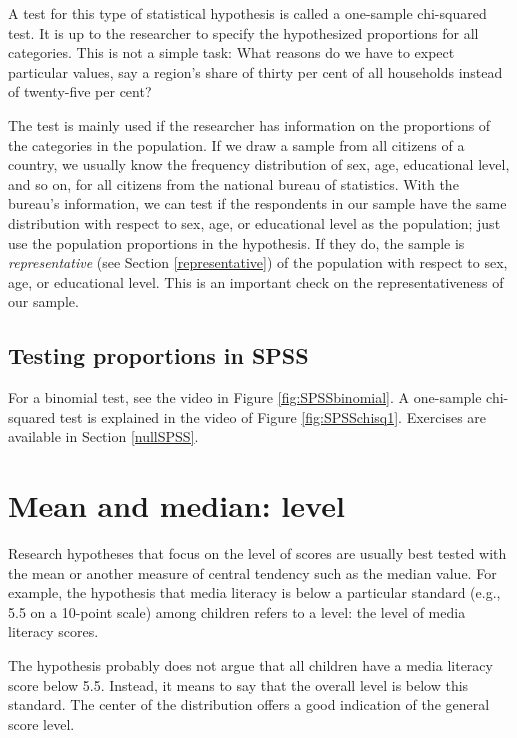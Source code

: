 \documentclass[a4paper]{book}
\theoremstyle{definition}
\theoremstyle{definition}
\theoremstyle{definition}
\theoremstyle{remark}
\begin{document}
A test for this type of statistical hypothesis is called a one-sample
chi-squared test. It is up to the researcher to specify the hypothesized
proportions for all categories. This is not a simple task: What reasons
do we have to expect particular values, say a region's share of thirty
per cent of all households instead of twenty-five per cent?

The test is mainly used if the researcher has information on the
proportions of the categories in the population. If we draw a sample
from all citizens of a country, we usually know the frequency
distribution of sex, age, educational level, and so on, for all citizens
from the national bureau of statistics. With the bureau's information,
we can test if the respondents in our sample have the same distribution
with respect to sex, age, or educational level as the population; just
use the population proportions in the hypothesis. If they do, the sample
is \emph{representative} (see Section \ref{representative}) of the
population with respect to sex, age, or educational level. This is an
important check on the representativeness of our sample.

\subsection*{Testing proportions in
SPSS}\label{testing-proportions-in-spss}

For a binomial test, see the video in Figure \ref{fig:SPSSbinomial}. A
one-sample chi-squared test is explained in the video of Figure
\ref{fig:SPSSchisq1}. Exercises are available in Section \ref{nullSPSS}.

\section*{Mean and median: level}\label{mean-and-median-level}

Research hypotheses that focus on the level of scores are usually best
tested with the mean or another measure of central tendency such as the
median value. For example, the hypothesis that media literacy is below a
particular standard (e.g., 5.5 on a 10-point scale) among children
refers to a level: the level of media literacy scores.

The hypothesis probably does not argue that all children have a media
literacy score below 5.5. Instead, it means to say that the overall
level is below this standard. The center of the distribution offers a
good indication of the general score level.
\end{document}
